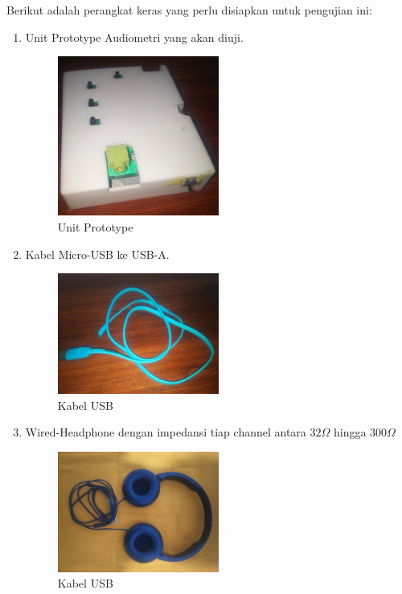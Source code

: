 \documentclass[12pt,]{article}
\begin{document}
	Berikut adalah perangkat keras yang perlu disiapkan untuk pengujian ini:
	\begin{enumerate}
		\item Unit Prototype Audiometri yang akan diuji.
		\begin{figure}[!ht]
			\centering
			\includegraphics[width=150pt]{images/foto/unit}
			\caption{Unit Prototype}
		\end{figure}
	
		\item Kabel Micro-USB ke USB-A.
		\begin{figure}[!ht]
			\centering
			\includegraphics[width=150pt]{images/foto/kabel}
			\caption{Kabel USB}
		\end{figure}
	
		\item Wired-Headphone dengan impedansi tiap channel antara $32\Omega$ hingga $300\Omega$
		\begin{figure}[!ht]
			\centering
			\includegraphics[width=150pt]{images/foto/phone}
			\caption{Kabel USB}
		\end{figure}
	

\end{enumerate}
\end{document}
